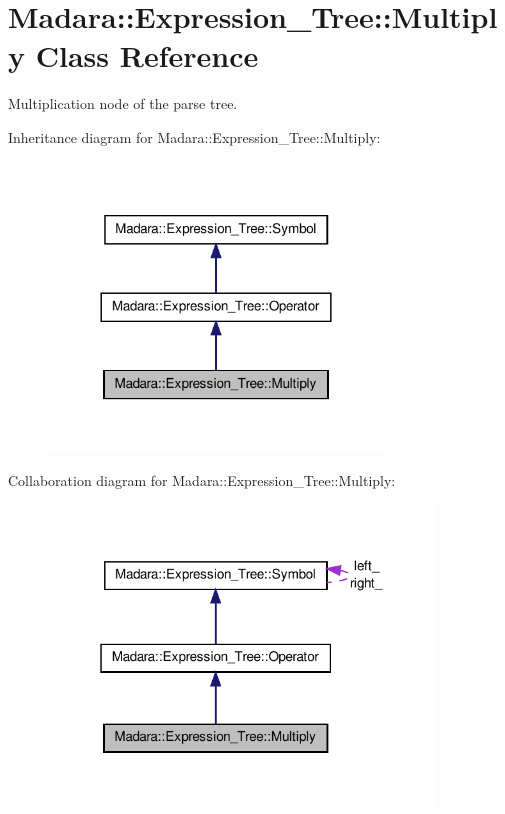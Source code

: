 \hypertarget{classMadara_1_1Expression__Tree_1_1Multiply}{
\section{Madara::Expression\_\-Tree::Multiply Class Reference}
\label{da/d86/classMadara_1_1Expression__Tree_1_1Multiply}
}


Multiplication node of the parse tree.  




Inheritance diagram for Madara::Expression\_\-Tree::Multiply:
\nopagebreak
\begin{figure}[H]
\begin{center}
\leavevmode
\includegraphics[width=252pt]{da/d6f/classMadara_1_1Expression__Tree_1_1Multiply__inherit__graph}
\end{center}
\end{figure}


Collaboration diagram for Madara::Expression\_\-Tree::Multiply:
\nopagebreak
\begin{figure}[H]
\begin{center}
\leavevmode
\includegraphics[width=292pt]{d3/da3/classMadara_1_1Expression__Tree_1_1Multiply__coll__graph}
\end{center}
\end{figure}
